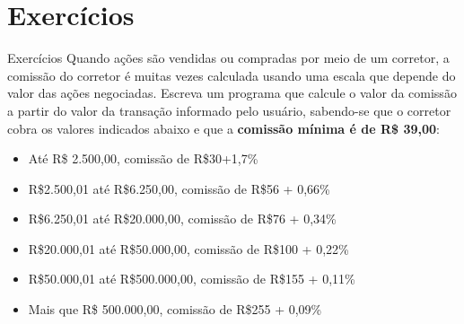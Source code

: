 \documentclass[handout]{beamer}
\begin{document}
\section{Exercícios}

\begin{frame}[fragile]{Exercícios}
    Quando ações são vendidas ou compradas por meio de um corretor, a comissão do corretor é muitas vezes calculada usando uma escala que depende do valor das ações negociadas. Escreva um programa que calcule o valor da comissão a partir do valor da transação informado pelo usuário, sabendo-se que o corretor cobra os valores indicados abaixo e que a {\bf comissão mínima é de R\$ 39,00}:
    \begin{itemize}
        \item Até  R\$ 2.500,00, comissão de R\$30+1,7\%
        \item R\$2.500,01 até R\$6.250,00, comissão de R\$56 + 0,66\%
        \item R\$6.250,01 até R\$20.000,00, comissão de R\$76 + 0,34\%
        \item R\$20.000,01 até R\$50.000,00, comissão de R\$100 + 0,22\%
        \item R\$50.000,01 até R\$500.000,00, comissão de R\$155 + 0,11\%
        \item Mais que R\$ 500.000,00, comissão de R\$255 + 0,09\%
    \end{itemize}
\end{frame}
\end{document}

